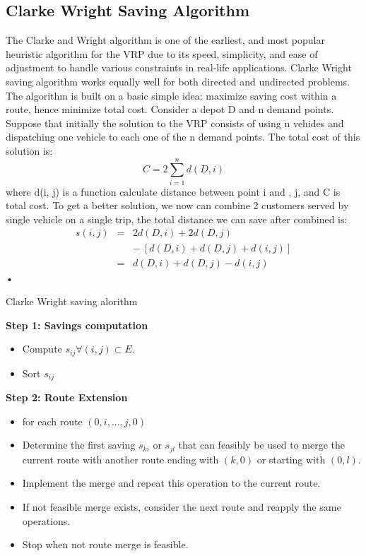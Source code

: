 \documentclass[../main.tex]{}
\begin{document}
\subsection{Clarke Wright Saving Algorithm}
The Clarke and Wright algorithm \cite{clarke_wright} is one of the earliest, and most popular heuristic algorithm for the VRP due to its speed, simplicity, and ease of adjustment to handle various constraints in real-life applications. Clarke Wright saving algorithm works equally well for both directed and undirected problems. The algorithm is built on a basic simple idea: maximize saving cost within a route, hence minimize total cost. Consider a depot D and n demand points. Suppose that initially the solution to the VRP consists of using n vehides and dispatching one vehicle to each one of the n demand points. The total cost of this solution is:
\[ C = 2\sum\limits_{i=1}^n d(D, i)\]
where d(i, j) is a function calculate distance between point i and , j, and C is total cost. To get a better solution, we now can combine 2 customers served by single vehicle on a single trip, the total distance we can save after combined is:
\begin{eqnarray}
s(i, j) & = & 2d(D, i) + 2d(D, j) \nonumber \\
&& -\: [d(D, i) + d(D, j) + d(i, j)] \nonumber \\
& = & d(D, i) + d(D, j) - d(i, j)
\end{eqnarray}•
\begin{algorithm}
\caption{Clarke Wright saving alorithm}\label{alg:clarke_wright}
\textbf{Step 1: Savings computation}
\flushleft
\begin{itemize}
\item Compute $s_{ij} \forall(i, j) \subset E$.
\item Sort $s_{ij}$
\end{itemize}
\textbf{Step 2:  Route Extension}
\flushleft
\begin{itemize}
\item for each route $(0, i, ..., j, 0)$
\item Determine the first saving ${s_{ki}}$ or ${s_{jl}}$ that can feasibly be used to merge the current route with another route ending with ${(k,0)}$ or starting with ${(0,l)}$.
\item Implement the merge and repeat this operation to the current route.
\item If not feasible merge exists, consider the next route and reapply the same operations.
\item Stop when not route merge is feasible.
\end{itemize}
\end{algorithm}
\end{document}
